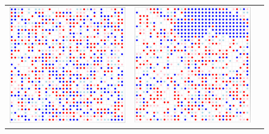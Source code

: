 \documentclass[12pt, a4paper]{article}
\begin{document}
\begin{figure}[H]
\begin{tabular}{ccc}
			\includegraphics[scale=0.35]{Plots/AUS_step0.PNG} &  
			\includegraphics[scale=0.35]{Plots/AUS_step25.PNG} &

\end{tabular}
\end{figure}
\end{document}
